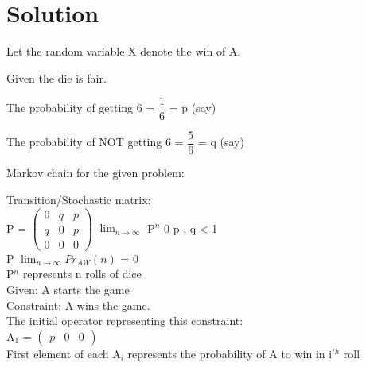 \documentclass[journal,12pt,twocolumn]{IEEEtran}
\theoremstyle{remark}
\newcommand{\myvec}[1]{\ensuremath{\begin{pmatrix}#1\end{pmatrix}}}
\numberwithin{equation}{subsection}
\begin{document}
\section{\Large Solution}
\begin{description}
    \item Let the random variable X denote the win of A.
    \item Given the die is fair.
    \item The probability of getting 6 = $\dfrac{1}{6}$ = p (say)
    \item The probability of NOT getting 6 = $\dfrac{5}{6}$ = q (say)
    \item Markov chain for the given problem:
\end{description}
\begin{center}
\end{center}
\begin{definition}
Transition/Stochastic matrix:\\
    P = \myvec{
    0 & q & p\\
    q & 0 & p\\
    0 & 0 & 0}
    \implies $\lim_{n \to \infty}$ P$^n$ \xrightarrow{} 0 \because p , q < 1\\
    \implies P 
    \implies $\lim_{n \to \infty}$$Pr_{AW}(n)$ = 0\\
    P$^n$ represents n rolls of dice\\
    Given: A starts the game\\
    Constraint: A wins the game.\\
    The initial operator representing this constraint:\\
    A$_1$ = \myvec{p & 0 & 0}\\
    First element of each A$_i$ represents the probability of A to win in i$^{th}$ roll
    
\end{definition}
\end{document}
